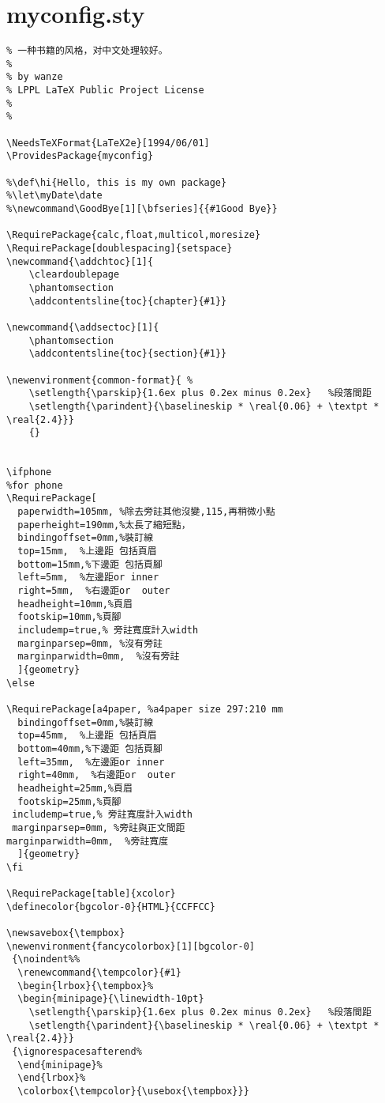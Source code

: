 \section{myconfig.sty}
\begin{verbatim}
% 一种书籍的风格，对中文处理较好。
% 
% by wanze
% LPPL LaTeX Public Project License
%  
%

\NeedsTeXFormat{LaTeX2e}[1994/06/01]
\ProvidesPackage{myconfig}

%\def\hi{Hello, this is my own package}
%\let\myDate\date
%\newcommand\GoodBye[1][\bfseries]{{#1Good Bye}}

\RequirePackage{calc,float,multicol,moresize} 
\RequirePackage[doublespacing]{setspace}
\newcommand{\addchtoc}[1]{ 
	\cleardoublepage   
	\phantomsection    
	\addcontentsline{toc}{chapter}{#1}}
	
\newcommand{\addsectoc}[1]{ 
	\phantomsection    
	\addcontentsline{toc}{section}{#1}}

\newenvironment{common-format}{ %
	\setlength{\parskip}{1.6ex plus 0.2ex minus 0.2ex}   %段落間距
	\setlength{\parindent}{\baselineskip * \real{0.06} + \textpt * \real{2.4}}}  
    {}


\ifphone
%for phone
\RequirePackage[
  paperwidth=105mm, %除去旁註其他沒變,115,再稍微小點
  paperheight=190mm,%太長了縮短點，
  bindingoffset=0mm,%裝訂線
  top=15mm,  %上邊距 包括頁眉
  bottom=15mm,%下邊距 包括頁腳
  left=5mm,  %左邊距or inner
  right=5mm,  %右邊距or  outer
  headheight=10mm,%頁眉
  footskip=10mm,%頁腳
  includemp=true,% 旁註寬度計入width
  marginparsep=0mm, %沒有旁註
  marginparwidth=0mm,  %沒有旁註
  ]{geometry}
\else

\RequirePackage[a4paper, %a4paper size 297:210 mm
  bindingoffset=0mm,%裝訂線
  top=45mm,  %上邊距 包括頁眉
  bottom=40mm,%下邊距 包括頁腳
  left=35mm,  %左邊距or inner
  right=40mm,  %右邊距or  outer
  headheight=25mm,%頁眉
  footskip=25mm,%頁腳
 includemp=true,% 旁註寬度計入width
 marginparsep=0mm, %旁註與正文間距
marginparwidth=0mm,  %旁註寬度
  ]{geometry}
\fi

\RequirePackage[table]{xcolor}  
\definecolor{bgcolor-0}{HTML}{CCFFCC} 

\newsavebox{\tempbox}
\newenvironment{fancycolorbox}[1][bgcolor-0]
 {\noindent%%
  \renewcommand{\tempcolor}{#1}
  \begin{lrbox}{\tempbox}%
  \begin{minipage}{\linewidth-10pt}
  	\setlength{\parskip}{1.6ex plus 0.2ex minus 0.2ex}   %段落間距
	\setlength{\parindent}{\baselineskip * \real{0.06} + \textpt * \real{2.4}}}  	
 {\ignorespacesafterend%
  \end{minipage}%
  \end{lrbox}%
  \colorbox{\tempcolor}{\usebox{\tempbox}}}  



\end{verbatim}
